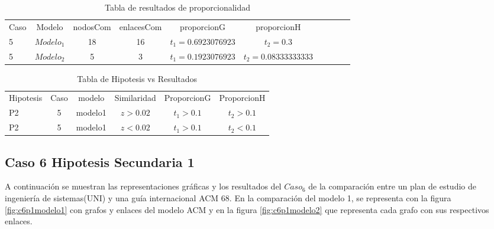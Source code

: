 \begin{table}[H]
\centering
\caption{Tabla de resultados de proporcionalidad}
\begin{tabular}[t]{lccccccccc}
\hline
Caso & Modelo & nodosCom & enlacesCom & proporcionG &proporcionH \\
5 & $Modelo_1$ & 18 & 16 & $t_1=0.6923076923$ & $t_2=0.3$\\
5 & $Modelo_2$ & 5 & 3 & $t_1=0.1923076923$ & $t_2=0.08333333333$\\
\hline
\end{tabular}
\label{tab:tabresultados2_C5}
\end{table}

\begin{table}[H]
\centering
\caption{Tabla de Hipotesis vs Resultados }
\begin{tabular}[t]{lccccc}
\hline
Hipotesis & Caso & modelo & Similaridad & ProporcionG & ProporcionH\\
P2 & 5 & modelo1 &$z>0.02$&$t_1>0.1$&$t_2>0.1$\\
P2 & 5 & modelo1 &$z<0.02$&$t_1>0.1$&$t_2<0.1$\\
\hline
\end{tabular}
\label{tab:hipotesis_C5}
\end{table}


\clearpage


\subsection{Caso 6 Hipotesis Secundaria 1}

A continuación se muestran las representaciones gráficas y los resultados del $Caso_6$ de la comparación entre un plan de estudio de ingeniería de sistemas(UNI) y una guía internacional ACM 68. En la comparación del modelo 1, se representa con la figura \ref{fig:c6p1modelo1} con grafos y enlaces del modelo ACM y en la figura \ref{fig:c6p1modelo2} que representa cada grafo con sus respectivos enlaces. 

